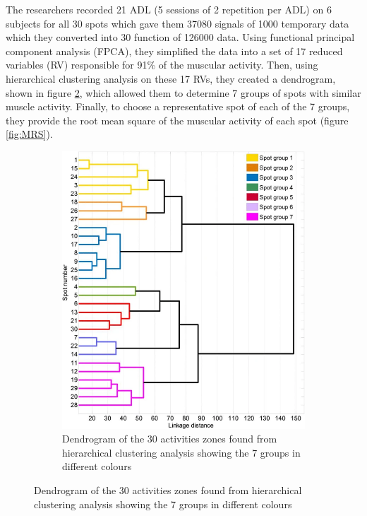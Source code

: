 \documentclass{article}
\begin{document}
	The researchers recorded 21 ADL (5 sessions of 2 repetition per ADL) on 6 subjects for all 30 spots which gave them 37080 signals of 1000 temporary data which they converted into 30 function of 126000 data. Using functional principal component analysis (FPCA), they simplified the data into a set of 17 reduced variables (RV) responsible for 91\% of the muscular activity. Then, using hierarchical clustering analysis on these 17 RVs, they created a dendrogram, shown in figure \ref{fig:dendrogram}, which allowed them to determine 7 groups of spots with similar muscle activity. Finally, to choose a representative spot of each of the 7 groups, they provide the root mean square of the muscular activity of each spot (figure \ref{fig:MRS}).
	
	\begin{figure}[H] 
		\centering
		\begin{subfigure}{.45 \textwidth}
			\centering
			\includegraphics[width=1\linewidth]{images/forearmActivityZonesDendrogram.png}
			\caption{Dendrogram of the 30 activities zones found from hierarchical clustering analysis showing the 7 groups in different colours}
			\label{fig:dendrogram}
		\end{subfigure}%

\end{figure}
\end{document}

